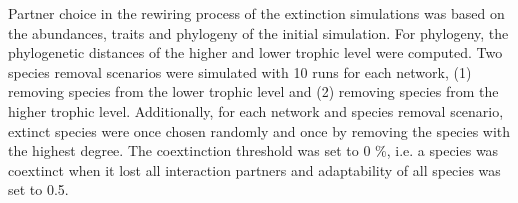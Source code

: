 \documentclass[12pt,a4paper]{article}
\begin{document}
Partner choice in the rewiring process of the extinction simulations was based on the abundances, traits and phylogeny of the initial simulation. For phylogeny, the phylogenetic distances of the higher and lower trophic level were computed. Two species removal scenarios were simulated with 10 runs for each network, (1) removing species from the lower trophic level and (2) removing species from the higher trophic level. Additionally, for each network and species removal scenario, extinct species were once chosen randomly and once by removing the species with the highest degree. The coextinction threshold was set to 0 \%, i.e. a species was coextinct when it lost all interaction partners and adaptability of all species was set to 0.5.
\end{document}
